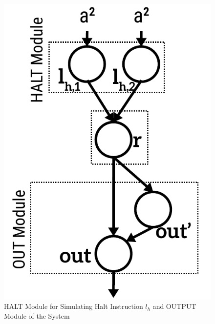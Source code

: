 \documentclass[runningheads,a4paper]{llncs}
\begin{document}
\begin{figure}
\begin{center}
\includegraphics[scale=0.50]{figures/fin-module-2.pdf}
\caption{HALT Module for Simulating Halt Instruction $l_h$ and OUTPUT Module of the System}
\label{fig-halt}
\end{center}
\end{figure}   
\end{document}
